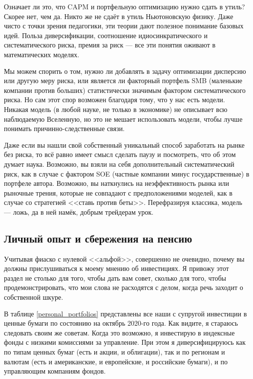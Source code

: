 Означает ли это, что CAPM и портфельную оптимизацию нужно сдать в утиль? Скорее 
нет, чем да. Никто же не сдаёт в утиль Ньютоновскую физику. Даже чисто с точки
зрения педагогики, эти теории дают полезное понимание базовых идей. Польза 
диверсификации, соотношение идиосинкратического и систематического риска, 
премия за риск --- все эти понятия оживают в математических моделях.

Мы можем спорить о том, нужно ли добавлять в задачу оптимизации дисперсию или 
другую меру риска, или является ли факторный портфель SMB (маленькие компании 
против больших) статистически значимым фактором систематического риска. Но сам 
этот спор возможен благодаря тому, что у нас есть модели. Никакая модель (в 
любой науке, не только в экономике) не описывает всю наблюдаемую Вселенную, но 
это не мешает использовать модели, чтобы лучше понимать причинно-следственные 
связи.

Даже если вы нашли свой собственный уникальный способ заработать на рынке без
риска, то всё равно имеет смысл сделать паузу и посмотреть, что об этом думает
наука. Возможно, вы взяли на себя дополнительный систематический риск, как в
случае с фактором SOE (частные компании минус государственные) в портфеле 
автора. Возможно, вы наткнулись на неэффективность рынка или рыночные трения, 
которые не совпадают с предположениями моделей, как в случае со стратегией 
<<ставь против беты>>. Перефразируя классика, модель --- ложь, да в ней намёк, 
добрым трейдерам урок.

\subsection{Личный опыт и сбережения на пенсию}

Учитывая фиаско с нулевой <<альфой>>, совершенно не очевидно, почему вы должны
прислушиваться к моему мнению об инвестициях. Я привожу этот раздел не столько
для того, чтобы дать вам совет, сколько для того, чтобы продемонстрировать, что
мои слова не расходятся с делом, когда речь заходит о собственной шкуре.

В таблице \ref{personal_portfolios} представлены все наши с супругой инвестиции
в ценные бумаги по состоянию на октябрь 2020-го года. Как видите, я стараюсь
следовать своим же советам. Когда это возможно, я инвестирую в индексные фонды 
с низкими комиссиями за управление. При этом я диверсифицируюсь как по типам
ценных бумаг (есть и акции, и облигации), так и по регионам и валютам (есть и
американские, и европейские, и российские бумаги), и по управляющим компаниям 
фондов.

